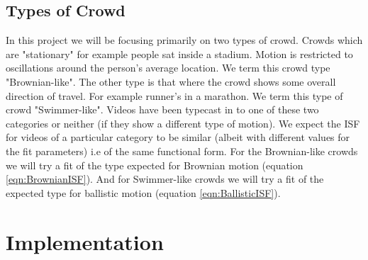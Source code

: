 \documentclass[11pt]{article}
\begin{document}
\subsection{Types of Crowd}
In this project we will be focusing primarily on two types of crowd. Crowds which are "stationary" for example people sat inside a stadium. Motion is restricted to oscillations around the person's average location. We term this crowd type "Brownian-like". The other type is that where the crowd shows some overall direction of travel. For example runner's in a marathon. We term this type of crowd "Swimmer-like". Videos have been typecast in to one of these two categories or neither (if they show a different type of motion). We expect the ISF for videos of a particular category to be similar (albeit with different values for the fit parameters) i.e of the same functional form. For the Brownian-like crowds we will try a fit of the type expected for Brownian motion (equation \ref{eqn:BrownianISF}). And for Swimmer-like crowds we will try a fit of the expected type for ballistic motion (equation \ref{eqn:BallisticISF}).

\clearpage
\section{Implementation}
\end{document}
